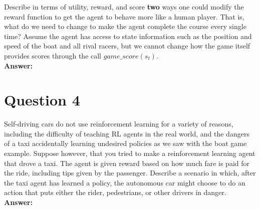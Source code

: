 \documentclass[12pt]{extarticle}
\begin{document}
\noindent Describe in terms of utility, reward, and score \textbf{two} ways one could modify the reward function to get the agent to behave more like a human player. That is, what do we need to change to make the agent complete the course every single time? Assume the agent has access to state information such as the position and speed of the boat and all rival racers, but we cannot change how the game itself provides scores through the call $game\_score(s_t)$. \\

\noindent\textbf{Answer:} 

\newpage
\section*{Question 4}

Self-driving cars do not use reinforcement learning for a variety of reasons, including the difficulty of teaching RL agents in the real world, and the dangers of a taxi accidentally learning undesired policies as we saw with the boat game example. Suppose however, that you tried to make a reinforcement learning agent that drove a taxi. The agent is given reward based on how much fare is paid for the ride, including tips given by the passenger. Describe a scenario in which, after the taxi agent has learned a policy, the autonomous car might choose to do an action that puts either the rider, pedestrians, or other drivers in danger. \\

\noindent\textbf{Answer:}
\end{document}

